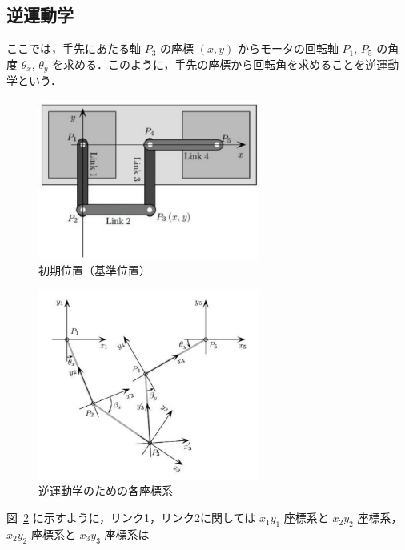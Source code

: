 \subsection{逆運動学}

ここでは，手先にあたる軸 $P_3$ の座標 $(x, y)$ からモータの回転軸 $P_1$, $P_5$ の角度 $\theta_x$, $\theta_y$ を求める．このように，手先の座標から回転角を求めることを逆運動学という．

\begin{figure}[H]
  \centering
  \includegraphics[width=0.65\textwidth]{figure/robot_fig3.pdf} %
  \caption{初期位置（基準位置）}
  \label{fig:init_pos}
\end{figure}

\begin{figure}[H]
  \centering
  \includegraphics[width=0.65\textwidth]{figure/robot_fig4.pdf} %
  \caption{逆運動学のための各座標系}
  \label{fig:frames}
\end{figure}

図~\ref{fig:frames} に示すように，リンク1，リンク2に関しては $x_1 y_1$ 座標系と $x_2 y_2$ 座標系，$x_2 y_2$ 座標系と $x_3 y_3$ 座標系は

